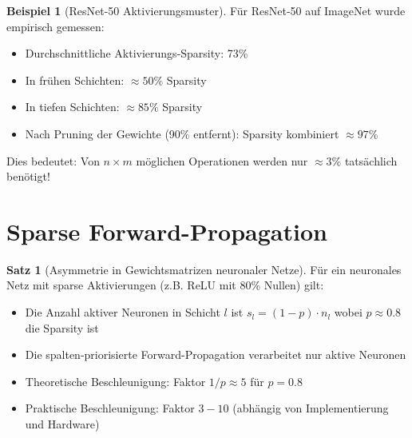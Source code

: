 ﻿\documentclass[a4paper,12pt]{report}
\theoremstyle{definition}
\newtheorem{beispiel}{Beispiel}
\newtheorem{satz}{Satz}
\begin{document}
	\begin{beispiel}[ResNet-50 Aktivierungsmuster]
		Für ResNet-50 auf ImageNet wurde empirisch gemessen:
		\begin{itemize}
			\item Durchschnittliche Aktivierungs-Sparsity: 73\%
			\item In frühen Schichten: $\approx 50\%$ Sparsity
			\item In tiefen Schichten: $\approx 85\%$ Sparsity
			\item Nach Pruning der Gewichte (90\% entfernt): Sparsity kombiniert $\approx 97\%$
		\end{itemize}
		
		Dies bedeutet: Von $n \times m$ möglichen Operationen werden nur $\approx 3\%$ tatsächlich benötigt!
	\end{beispiel}
	
	\section{Sparse Forward-Propagation}
	
	\begin{satz}[Asymmetrie in Gewichtsmatrizen neuronaler Netze]
		Für ein neuronales Netz mit sparse Aktivierungen (z.B. ReLU mit 80\% Nullen) gilt:
		\begin{itemize}
			\item Die Anzahl aktiver Neuronen in Schicht $l$ ist $s_l = (1-p) \cdot n_l$ wobei $p \approx 0.8$ die Sparsity ist
			\item Die spalten-priorisierte Forward-Propagation verarbeitet nur aktive Neuronen
			\item Theoretische Beschleunigung: Faktor $1/p \approx 5$ für $p = 0.8$
			\item Praktische Beschleunigung: Faktor $3-10$ (abhängig von Implementierung und Hardware)
		\end{itemize}
	\end{satz}
	
\end{document}
